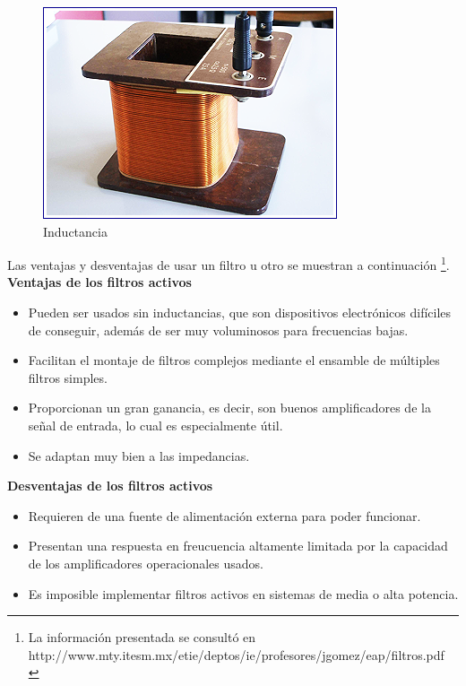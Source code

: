 \documentclass[prb,aps,preprintnumbers,amsmath,amssymb]{revtex4}
\begin{document}
\begin{figure}
\begin{minipage}{.33\textwidth}
  \centering
  \includegraphics[width=.7\textwidth,height=0.15\textheight]{inductancia}
  \caption{Inductancia}
  \label{fig: inductancia}
\end{minipage}
\label{fig: pasivos}
\end{figure}

Las ventajas y desventajas de usar un filtro u otro se muestran a continuación \footnote{La información presentada se consultó en http://www.mty.itesm.mx/etie/deptos/ie/profesores/jgomez/eap/filtros.pdf\\}.\\

\textbf{Ventajas de los filtros activos}

\begin{itemize}
	\item Pueden ser usados sin inductancias, que son dispositivos electrónicos difíciles de conseguir, además de ser muy voluminosos para frecuencias bajas.
	
	\item Facilitan el montaje de filtros complejos mediante el ensamble de múltiples filtros simples.
	
	\item Proporcionan un gran ganancia, es decir, son buenos amplificadores de la señal de entrada, lo cual es especialmente útil.
	
	\item Se adaptan muy bien a las impedancias.
\end{itemize}

\textbf{Desventajas de los filtros activos}

\begin{itemize}
	\item Requieren de una fuente de alimentación externa para poder funcionar.
	
	\item Presentan una respuesta en freucuencia altamente limitada por la capacidad de los amplificadores operacionales usados.
	
	\item Es imposible implementar filtros activos en sistemas de media o alta potencia.
\end{itemize}
\end{document}

